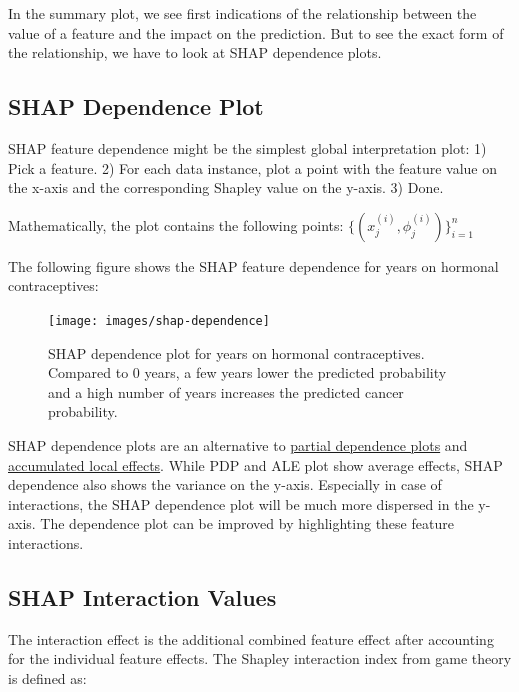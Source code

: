 \documentclass[
  10pt,
]{scrbook}
\begin{document}
In the summary plot, we see first indications of the relationship between the value of a feature and the impact on the prediction.
But to see the exact form of the relationship, we have to look at SHAP dependence plots.

\hypertarget{shap-dependence-plot}{%
\subsection{SHAP Dependence Plot}\label{shap-dependence-plot}}

SHAP feature dependence might be the simplest global interpretation plot:
1) Pick a feature.
2) For each data instance, plot a point with the feature value on the x-axis and the corresponding Shapley value on the y-axis.
3) Done.

Mathematically, the plot contains the following points: \(\{(x_j^{(i)},\phi_j^{(i)})\}_{i=1}^n\)

The following figure shows the SHAP feature dependence for years on hormonal contraceptives:

\begin{figure}

{\centering \texttt{[image: images/shap-dependence]} 

}

\caption{SHAP dependence plot for years on hormonal contraceptives. Compared to 0 years, a few years lower the predicted probability and a high number of years increases the predicted cancer probability.}\label{fig:unnamed-chunk-47}
\end{figure}

SHAP dependence plots are an alternative to \protect\hyperlink{pdp}{partial dependence plots} and \protect\hyperlink{ale}{accumulated local effects}.
While PDP and ALE plot show average effects, SHAP dependence also shows the variance on the y-axis.
Especially in case of interactions, the SHAP dependence plot will be much more dispersed in the y-axis.
The dependence plot can be improved by highlighting these feature interactions.

\hypertarget{shap-interaction-values}{%
\subsection{SHAP Interaction Values}\label{shap-interaction-values}}

The interaction effect is the additional combined feature effect after accounting for the individual feature effects.
The Shapley interaction index from game theory is defined as:
\end{document}
